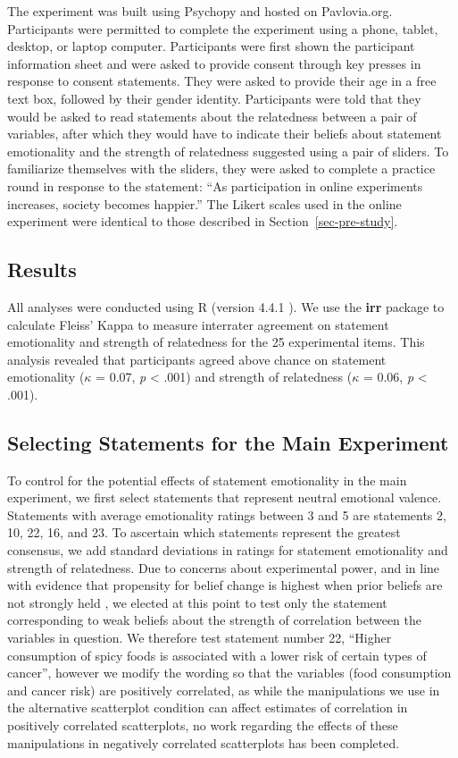 \documentclass[manuscript,screen,review,anonymous]{acmart}
\begin{document}
The experiment was built using Psychopy \citep{pierce_2019} and hosted
on Pavlovia.org. Participants were permitted to complete the experiment
using a phone, tablet, desktop, or laptop computer. Participants were
first shown the participant information sheet and were asked to provide
consent through key presses in response to consent statements. They were
asked to provide their age in a free text box, followed by their gender
identity. Participants were told that they would be asked to read
statements about the relatedness between a pair of variables, after
which they would have to indicate their beliefs about statement
emotionality and the strength of relatedness suggested using a pair of
sliders. To familiarize themselves with the sliders, they were asked to
complete a practice round in response to the statement: ``As
participation in online experiments increases, society becomes
happier.'' The Likert scales used in the online experiment were
identical to those described in Section~\ref{sec-pre-study}.

\subsection{Results}\label{sec-results-pre}

All analyses were conducted using R (version 4.4.1 \citep{rcore}). We
use the \textbf{irr} package to calculate Fleiss' Kappa to measure
interrater agreement on statement emotionality and strength of
relatedness for the 25 experimental items. This analysis revealed that
participants agreed above chance on statement emotionality (\(\kappa\) =
0.07, \emph{p} \textless{} .001) and strength of relatedness (\(\kappa\)
= 0.06, \emph{p} \textless{} .001).

\subsection{Selecting Statements for the Main
Experiment}\label{sec-selecting-statements}

To control for the potential effects of statement emotionality in the
main experiment, we first select statements that represent neutral
emotional valence. Statements with average emotionality ratings between
3 and 5 are statements 2, 10, 22, 16, and 23. To ascertain which
statements represent the greatest consensus, we add standard deviations
in ratings for statement emotionality and strength of relatedness. Due
to concerns about experimental power, and in line with evidence that
propensity for belief change is highest when prior beliefs are not
strongly held \citep{xiong_2022, markant_2023}, we elected at this point
to test only the statement corresponding to weak beliefs about the
strength of correlation between the variables in question. We therefore
test statement number 22, ``Higher consumption of spicy foods is
associated with a lower risk of certain types of cancer'', however we
modify the wording so that the variables (food consumption and cancer
risk) are positively correlated, as while the manipulations we use in
the alternative scatterplot condition can affect estimates of
correlation in positively correlated scatterplots, no work regarding the
effects of these manipulations in negatively correlated scatterplots has
been completed.
\end{document}
